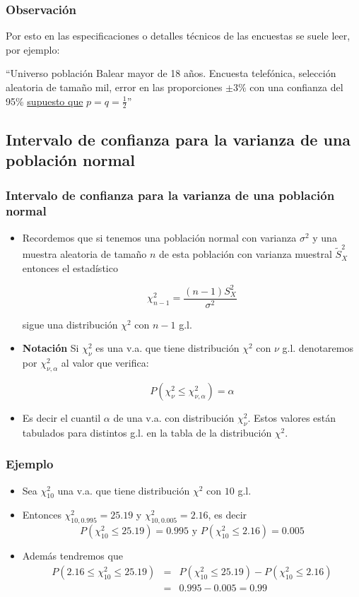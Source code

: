 \begin{frame}
\frametitle{Observación}
Por esto en las especificaciones o detalles
técnicos de las encuestas se suele leer, por ejemplo:

 ``Universo población Balear mayor de
18 años. Encuesta telefónica, selección aleatoria de tamaño mil, error en las proporciones
$\pm 3\% $ con una confianza del 95\% \underline{supuesto que} $p=q=\frac{1}{2}$''
\end{frame}
\subsection{Intervalo de confianza para la varianza de una
población normal}
\begin{frame}

\frametitle{Intervalo de confianza para la varianza de una
población normal}
\begin{itemize}
\item  Recordemos que si tenemos una población normal con varianza $\sigma^2$ y una  muestra aleatoria de  tamaño $n$ de esta
población con varianza muestral $\tilde{S}_{X}^2$ entonces el estadístico

        $$\chi^2_{n-1}=\frac{(n-1) S_{X}^2}{\sigma^2}$$

         sigue una distribución $\chi^2$ con $n-1$ g.l.
\item \textbf{Notación}
         Si $\chi_{\nu}^2$ es una v.a. que tiene distribución $\chi^2$ con
         $\nu$ g.l.  denotaremos por $\chi_{\nu,\alpha}^2$  al valor que
         verifica:

         $$P(\chi_{\nu}^2\leq \chi_{\nu,\alpha}^2)=\alpha$$

\item   Es decir el cuantil $\alpha$ de una v.a. con distribución $\chi_{\nu}^2.$  Estos valores están tabulados para distintos g.l. en la tabla de la distribución $\chi^2$.
\end{itemize}
\end{frame}

\begin{frame}  
     \frametitle{Ejemplo}
\begin{itemize}
\item Sea $\chi_{10}^2$ una v.a. que tiene distribución $\chi^2$ con $10$ g.l.
\item Entonces $\chi_{10,0.995}^2=25.19$ y  $\chi_{10,0.005}^2=2.16$, es decir
$$P(\chi_{10}^2\leq 25.19)=0.995\mbox{ y } P(\chi_{10}^2\leq 2.16)=0.005$$
\item  Además tendremos que
\begin{eqnarray*}
P(2.16\leq \chi_{10}^2\leq 25.19)&=&P(\chi_{10}^2\leq25.19)-P(\chi_{10}^2\leq 2.16)\\
&=&0.995-0.005=0.99
\end{eqnarray*}
\end{itemize}
\end{frame}

